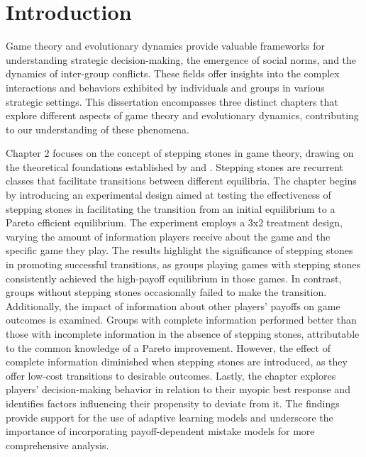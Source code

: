 \chapter{Introduction}

Game theory and evolutionary dynamics provide valuable frameworks for understanding strategic decision-making, the emergence of social norms, and the dynamics of inter-group conflicts. These fields offer insights into the complex interactions and behaviors exhibited by individuals and groups in various strategic settings. This dissertation encompasses three distinct chapters that explore different aspects of game theory and evolutionary dynamics, contributing to our understanding of these phenomena.

Chapter 2 focuses on the concept of stepping stones in game theory, drawing on the theoretical foundations established by \cite{young1993evolution} and \cite{ellison2000basins}. Stepping stones are recurrent classes that facilitate transitions between different equilibria. The chapter begins by introducing an experimental design aimed at testing the effectiveness of stepping stones in facilitating the transition from an initial equilibrium to a Pareto efficient equilibrium. The experiment employs a 3x2 treatment design, varying the amount of information players receive about the game and the specific game they play. The results highlight the significance of stepping stones in promoting successful transitions, as groups playing games with stepping stones consistently achieved the high-payoff equilibrium in those games. In contrast, groups without stepping stones occasionally failed to make the transition. Additionally, the impact of information about other players' payoffs on game outcomes is examined. Groups with complete information performed better than those with incomplete information in the absence of stepping stones, attributable to the common knowledge of a Pareto improvement. However, the effect of complete information diminished when stepping stones are introduced, as they offer low-cost transitions to desirable outcomes. Lastly, the chapter explores players' decision-making behavior in relation to their myopic best response and identifies factors influencing their propensity to deviate from it. The findings provide support for the use of adaptive learning models and underscore the importance of incorporating payoff-dependent mistake models for more comprehensive analysis.


